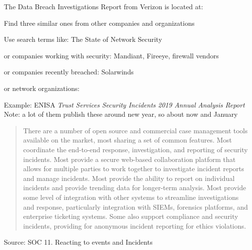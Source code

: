 \documentclass[Screen16to9,17pt]{foils}
\begin{document}
\begin{list2}
\item The Data Breach Investigations Report from Verizon is located at:\\
\item Find three similar ones from other companies and organizations

\item Use search terms like: The State of Network Security
\item or companies working with security: Mandiant, Fireeye, firewall vendors
\item or companies recently breached: Solarwinds
\item or network organizations:
\end{list2}
Example: ENISA \emph{Trust Services Security Incidents 2019 Annual Analysis Report}\\
Note: a lot of them publish these around new year, so about now and January




\begin{quote}
There are a number of open source and commercial case management tools available on the market, most sharing a set of common features. Most coordinate the end-to-end response, investigation, and reporting of security incidents. Most provide a secure web-based collaboration platform that allows for multiple parties to work together to investigate incident reports and manage incidents. Most provide the ability to report on individual incidents and provide trending data for longer-term analysis. Most provide some level of integration with other systems to streamline investigations and response, particularly integration with SIEMs, forensics platforms, and enterprise ticketing systems. Some also support compliance and security incidents, providing for anonymous incident reporting for ethics violations.
\end{quote}
Source:  SOC 11. Reacting to events and Incidents


\end{document}
